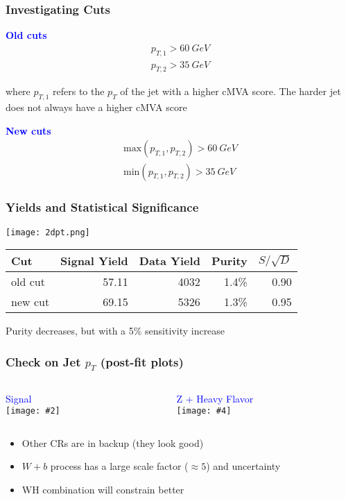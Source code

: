 \documentclass{beamer}
\newcommand{\twofigs}[4]{
  \begin{columns}
    \begin{column}{0.5\linewidth}
      \centering
      \textcolor{blue}{#1} \\
      \texttt{[image: \#2]}
    \end{column}
    \begin{column}{0.5\linewidth}
      \centering
      \textcolor{blue}{#3} \\
      \texttt{[image: \#4]}
    \end{column}
  \end{columns}
}
\begin{document}
\begin{frame}
  \frametitle{Investigating Cuts}

  {\centering \bf
    \Large{\textcolor{blue}{Old cuts}}
    \begin{gather*}
      p_{T,1} > \SI{60}{GeV} \\
      p_{T,2} > \SI{35}{GeV}
    \end{gather*}
  }

  where $p_{T,1}$ refers to the $p_T$ of the jet with a higher cMVA score.
  The harder jet does not always have a higher cMVA score

  {\centering \bf
    \Large{\textcolor{blue}{New cuts}}
    \begin{gather*}
      \mathrm{max}(p_{T,1}, p_{T,2}) > \SI{60}{GeV} \\
      \mathrm{min}(p_{T,1}, p_{T,2}) > \SI{35}{GeV}
    \end{gather*}
  }

\end{frame}

\begin{frame}
  \frametitle{Yields and Statistical Significance}

  \centering

  \texttt{[image: 2dpt.png]}

  \begin{center}
    \begin{tabular}{|l|r|r|r|r|}
      \hline
      Cut & Signal Yield & Data Yield & Purity & $S/\sqrt{D}$ \\
      \hline
      old cut & 57.11 & 4032 & 1.4\% & 0.90 \\
      new cut & 69.15 & 5326 & 1.3\% & 0.95 \\
      \hline
    \end{tabular}
  \end{center}

  Purity decreases, but with a 5\% sensitivity increase

\end{frame}

\begin{frame}
  \frametitle{Check on Jet $p_T$ (post-fit plots)}

  \twofigs{Signal}
          {180514_old/inclusive_signal_cmva_jet1_pt.pdf}
          {Z + Heavy Flavor}
          {180514_old/inclusive_heavyz_cmva_jet1_pt.pdf}

  \begin{itemize}
  \item Other CRs are in backup (they look good)
  \item $W + b$ process has a large scale factor ($\approx 5$) and uncertainty
  \item WH combination will constrain better
  \end{itemize}

\end{frame}
\end{document}
